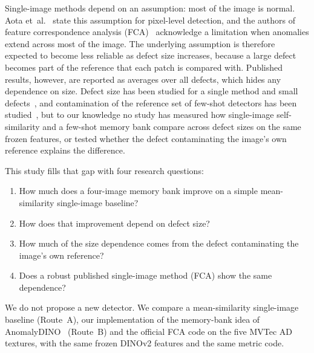 Single-image methods depend on an assumption: most of the image is normal.
Aota et~al.~\cite{aota2023zeroshot} state this assumption for pixel-level
detection, and the authors of feature correspondence analysis
(FCA)~\cite{ardelean2024highfidelity} acknowledge a limitation when anomalies
extend across most of the image. The underlying assumption is therefore
expected to become less reliable as defect size increases, because a large
defect becomes part of the reference that each patch is compared with.
Published results, however, are reported as averages over all defects, which
hides any dependence on size. Defect size has been studied for a single method
and small defects~\cite{lehr2024limitations}, and contamination of the
reference set of few-shot detectors has been studied~\cite{villanueva2026cleaning},
but to our knowledge no study has measured how single-image self-similarity and
a few-shot memory bank compare across defect sizes on the same frozen features,
or tested whether the defect contaminating the image's own reference explains
the difference.

This study fills that gap with four research questions:
\begin{enumerate}
  \item[RQ1:] How much does a four-image memory bank improve on a simple
  mean-similarity single-image baseline?
  \item[RQ2:] How does that improvement depend on defect size?
  \item[RQ3:] How much of the size dependence comes from the defect
  contaminating the image's own reference?
  \item[RQ4:] Does a robust published single-image method (FCA) show the same
  dependence?
\end{enumerate}

We do not propose a new detector. We compare a mean-similarity single-image
baseline (Route~A), our implementation of the memory-bank idea of
AnomalyDINO~\cite{damm2025anomalydino} (Route~B) and the official FCA code on
the five MVTec AD textures, with the same frozen DINOv2 features and the same
metric code.

